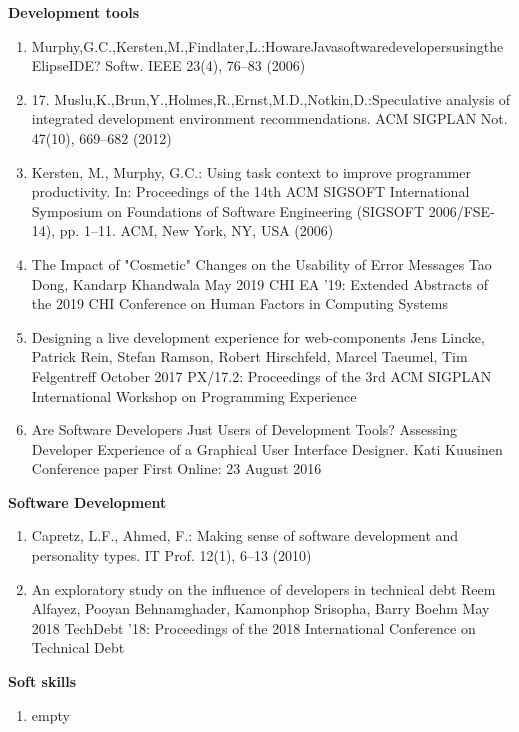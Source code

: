\documentclass[english, 12pt, a4paper, sci, utf8, a-1b, online]{aaltothesis}
\begin{document}
\textbf{Development tools}
\begin{enumerate}
  \item Murphy,G.C.,Kersten,M.,Findlater,L.:HowareJavasoftwaredevelopersusingtheElipseIDE? Softw. IEEE 23(4), 76–83 (2006)
  \item 17. Muslu,K.,Brun,Y.,Holmes,R.,Ernst,M.D.,Notkin,D.:Speculative analysis of integrated development environment recommendations. ACM SIGPLAN Not. 47(10), 669–682 (2012)
  \item Kersten, M., Murphy, G.C.: Using task context to improve programmer productivity. In: Proceedings of the 14th ACM SIGSOFT International Symposium on Foundations of Software Engineering (SIGSOFT 2006/FSE-14), pp. 1–11. ACM, New York, NY, USA (2006)
  \item The Impact of "Cosmetic" Changes on the Usability of Error Messages Tao Dong, Kandarp Khandwala May 2019 CHI EA '19: Extended Abstracts of the 2019 CHI Conference on Human Factors in Computing Systems
  \item Designing a live development experience for web-components Jens Lincke, Patrick Rein, Stefan Ramson, Robert Hirschfeld, Marcel Taeumel, Tim Felgentreff October 2017 PX/17.2: Proceedings of the 3rd ACM SIGPLAN International Workshop on Programming Experience
  \item Are Software Developers Just Users of Development Tools? Assessing Developer Experience of a Graphical User Interface Designer. Kati Kuusinen Conference paper First Online: 23 August 2016
\end{enumerate}

\textbf{Software Development}
\begin{enumerate}
  \item Capretz, L.F., Ahmed, F.: Making sense of software development and personality types. IT Prof. 12(1), 6–13 (2010)
  \item An exploratory study on the influence of developers in technical debt Reem Alfayez, Pooyan Behnamghader, Kamonphop Srisopha, Barry Boehm May 2018 TechDebt '18: Proceedings of the 2018 International Conference on Technical Debt
\end{enumerate}

\textbf{Soft skills}
\begin{enumerate}
  \item empty
\end{enumerate}
\end{document}
